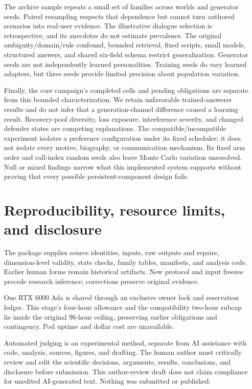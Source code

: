 The archive sample repeats a small set of families across worlds and generator seeds. Paired resampling respects that dependence but cannot turn authored scenarios into real-user evidence. The illustrative dialogue selection is retrospective, and its anecdotes do not estimate prevalence. The original ambiguity/domain/rule confound, bounded retrieval, fixed scripts, small models, structured answers, and shared six-field schema restrict generalization. Generator seeds are not independently learned personalities. Training seeds do vary learned adapters, but three seeds provide limited precision about population variation.

Finally, the core campaign's completed cells and pending obligations are separate from this bounded characterization. We retain unfavorable trained-answerer results and do not infer that a generation-channel difference caused a learning result. Recovery-pool diversity, loss exposure, interference severity, and changed defender states are competing explanations. The compatible/incompatible experiment isolates a preference configuration under its fixed scheduler; it does not isolate every motive, biography, or communication mechanism. Its fixed arm order and call-index random seeds also leave Monte Carlo variation unresolved. Null or mixed findings narrow what this implemented system supports without proving that every possible persistent-component design fails.

\section{Reproducibility, resource limits, and disclosure}
The package supplies source identities, inputs, raw outputs and repairs, dimension-level validity, state checks, family tables, manifests, and analysis code. Earlier human forms remain historical artifacts. New protocol and input freezes precede research inference; corrections preserve original evidence.

One RTX 6000 Ada is shared through an exclusive owner lock and reservation ledger. This stage's four-hour allowance and the compatibility two-hour subcap lie inside the original 96-hour ceiling, preserving earlier obligations and contingency. Pod uptime and dollar cost are unavailable.



Automated judging is an experimental method, separate from AI assistance with code, analysis, sources, figures, and drafting. The human author must critically review and edit the scientific decisions, arguments, results, conclusions, and disclosure before submission. This author-review draft does not claim compliance for unedited AI-generated text. Nothing was submitted or published.
